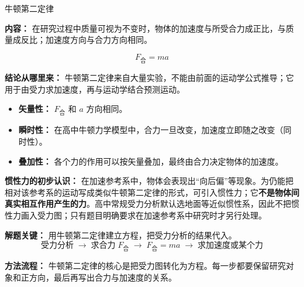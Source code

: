 \begin{conceptbox}{牛顿第二定律}

\textbf{内容：} 在研究过程中质量可视为不变时，物体的加速度与所受合力成正比，与质量成反比；加速度方向与合力方向相同。

\[
\boxed{F_{\text{合}} = ma}
\]

\textbf{结论从哪里来：} 牛顿第二定律来自大量实验，不能由前面的运动学公式推导；它用于由受力求加速度，再与运动学结合预测运动。

\begin{itemize}
  \item \textbf{矢量性：} $F_{\text{合}}$ 和 $a$ 方向相同。
  \item \textbf{瞬时性：} 在高中牛顿力学模型中，合力一旦改变，加速度立即随之改变（同时性）。
  \item \textbf{叠加性：} 各个力的作用可以按矢量叠加，最终由合力决定物体的加速度。
\end{itemize}

\textbf{惯性力的初步认识：} 在加速参考系中，物体会表现出“向后偏”等现象。为仍能把相对该参考系的运动写成类似牛顿第二定律的形式，可引入惯性力；它\textbf{不是物体间真实相互作用产生的力}。高中常规受力分析默认选地面等近似惯性系，因此不把惯性力画入受力图；只有题目明确要求在加速参考系中研究时才另行处理。

\textbf{解题关键：} 用牛顿第二定律建立方程，把受力分析的结果代入。
\[
\text{受力分析} \;\to\; \text{求合力}\; F_{\text{合}} \;\to\; F_{\text{合}} = ma \;\to\; \text{求加速度或某个力}
\]

\textbf{方法流程：} 牛顿第二定律的核心是把受力图转化为方程。每一步都要保留研究对象和正方向，最后再写出合力与加速度的关系。

\begin{center}


\label{fig:newton-solution-flow}
\end{center}

\begin{center}


\label{fig:newton-second}
\end{center}

\end{conceptbox}

